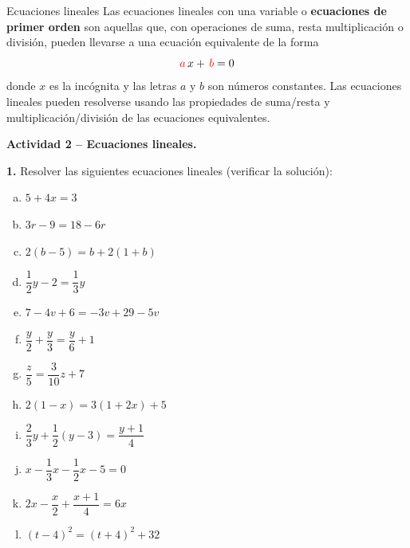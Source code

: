 \documentclass[9pt, aspectratio=169]{beamer}
\begin{document}
\begin{frame}{Ecuaciones lineales}
    Las ecuaciones lineales con una variable o \textbf{ecuaciones de primer orden} son aquellas que, con operaciones de suma, resta multiplicación o división, pueden llevarse a una ecuación equivalente de la forma
    \[ {\color{red} a} \, x + \, {\color{red} b} = 0 \]
    donde $x$ es la incógnita y las letras $a$ y $b$ son números constantes. Las ecuaciones lineales pueden resolverse usando las propiedades de suma/resta y multiplicación/división de las ecuaciones equivalentes.
\pause

\textbf{Actividad 2 -- Ecuaciones lineales.}

\textbf{1.} Resolver las siguientes ecuaciones lineales (\alert{verificar la solución}):
\begin{multicols}{3}
    \begin{enumerate}[a)]
        \item $5 + 4 x = 3$
    \item $ 3 r - 9 = 18 - 6 r$
    \item $2(b-5) = b + 2(1+b)$
    \item $\dfrac{1}{2} y - 2 = \dfrac{1}{3} y$
    \item $7 - 4 v + 6 = -3 v + 29 - 5 v$
    \item $\dfrac{y}{2} + \dfrac{y}{3} = \dfrac{y}{6} + 1$
    \item $\dfrac{z}{5} = \dfrac{3}{10} z + 7$
    \item $2(1-x) = 3(1 + 2x) + 5$
    \item $\dfrac{2}{3}y + \dfrac{1}{2}(y-3) = \dfrac{y + 1}{4}$
    \item $x - \dfrac{1}{3} x - \dfrac{1}{2} x - 5 = 0$
    \item $2x - \dfrac{x}{2} + \dfrac{x + 1}{4} = 6x$
    \item $(t-4)^2 = (t+4)^2 + 32$
\end{enumerate}
\end{multicols}
\end{frame}
\end{document}
